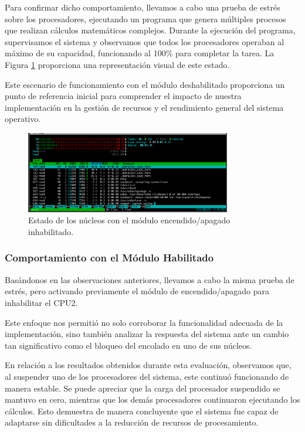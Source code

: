 Para confirmar dicho comportamiento, llevamos a cabo una prueba de estrés sobre los procesadores, ejecutando un programa que genera múltiples procesos que realizan cálculos matemáticos complejos. Durante la ejecución del programa, supervisamos el sistema y observamos que todos los procesadores operaban al máximo de su capacidad, funcionando al 100\% para completar la tarea. La Figura \ref{fig:cpuOnOff-result-full-load} proporciona una representación visual de este estado.\par

Este escenario de funcionamiento con el módulo deshabilitado proporciona un punto de referencia inicial para comprender el impacto de nuestra implementación en la gestión de recursos y el rendimiento general del sistema operativo.\par

\begin{figure}[H]
    \centering
    \includegraphics[width=0.8\textwidth]{images/cpuOnOff-result-full-load.png}
    \caption{Estado de los núcleos con el módulo encendido/apagado inhabilitado.}
    \label{fig:cpuOnOff-result-full-load}
\end{figure}

\subsubsection{Comportamiento con el Módulo Habilitado}
Basándonos en las observaciones anteriores, llevamos a cabo la misma prueba de estrés, pero activando previamente el módulo de encendido/apagado para inhabilitar el CPU2.\par

Este enfoque nos permitió no solo corroborar la funcionalidad adecuada de la implementación, sino también analizar la respuesta del sistema ante un cambio tan significativo como el bloqueo del encolado en uno de sus núcleos.\par

En relación a los resultados obtenidos durante esta evaluación, observamos que, al suspender uno de los procesadores del sistema, este continuó funcionando de manera estable. Se puede apreciar que la carga del procesador suspendido se mantuvo en cero, mientras que los demás procesadores continuaron ejecutando los cálculos. Esto demuestra de manera concluyente que el sistema fue capaz de adaptarse sin dificultades a la reducción de recursos de procesamiento.\par

